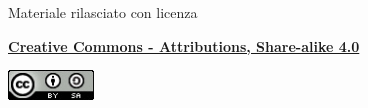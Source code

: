 \documentclass{beamer}
\begin{document}
\begin{frame}

\begin{center}
	\bigskip
	Materiale rilasciato con licenza
	
	\textbf{\href{http://creativecommons.org/licenses/by-sa/4.0/}{Creative Commons - Attributions, Share-alike 4.0}}
	
	\medskip
	\includegraphics[height=0.8cm]{images/cc.jpeg}
\end{center}

\end{frame}
	
\end{document}
